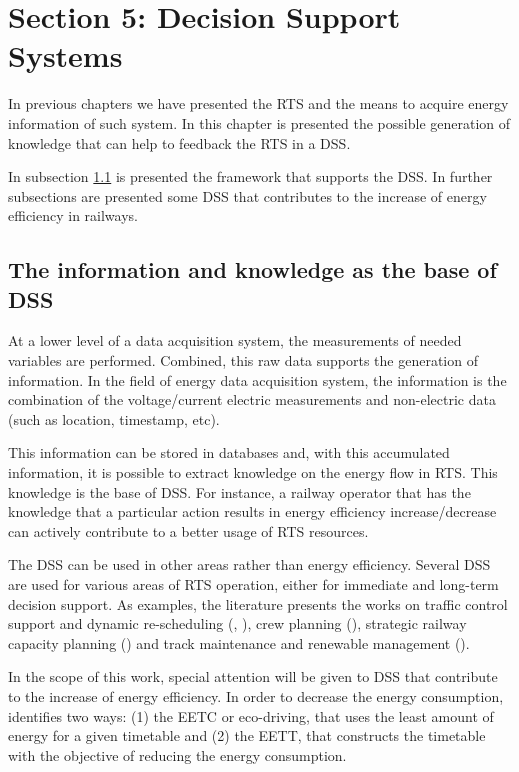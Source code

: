 


\section{Section 5: Decision Support Systems}
In previous chapters we have presented the \ac{RTS} and the means to acquire energy information of such system.
In this chapter is presented the possible generation of knowledge that can help to feedback the \ac{RTS} in a  \ac{DSS}.

In subsection \ref{subs:351} is presented the framework that supports the \ac{DSS}. In further subsections are presented some \ac{DSS} that contributes to the increase of energy efficiency in railways.


\subsection{The information and knowledge as the base of \ac{DSS}}
\label{subs:351}

	At a lower level of a data acquisition system, the measurements of needed variables are performed. 
	Combined, this raw data supports the generation of information.
	In the field of energy data acquisition system, the information is the combination of the voltage/current electric measurements and non-electric data (such as location, timestamp, etc).
	
	This information can be stored in databases and, with this accumulated information, it is possible to extract knowledge on the energy flow in \ac{RTS}.
	This knowledge is the base of \ac{DSS}. For instance, a railway operator that has the knowledge that a particular action results in energy efficiency increase/decrease can actively contribute to a better usage of \ac{RTS} resources.
	
	The \ac{DSS} can be used in other areas rather than energy efficiency. 	
	Several DSS are used for various areas of \ac{RTS} operation, either for immediate and long-term decision support.
	As examples, the literature presents the works on traffic control support and dynamic re-scheduling (\cite{dariano2009}, \cite{krasemann2012}), crew planning (\cite{freling2004}), strategic railway capacity planning (\cite{lai2011}) and track maintenance and renewable management (\cite{guler2013}).
	
	
	In the scope of this work, special attention will be given to \ac{DSS} that contribute to the increase of energy efficiency. In order to decrease the energy consumption, \cite{scheepmaker2017} identifies two ways: (1) the \ac{EETC} or eco-driving, that uses the least amount of energy for a given timetable and (2) the \ac{EETT}, that constructs the timetable with the objective of reducing the energy consumption.
	
